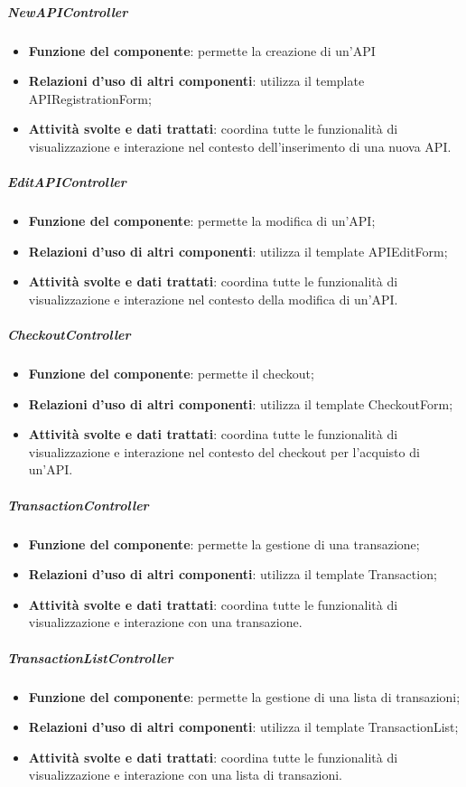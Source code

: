 \subparagraph{NewAPIController}
\begin{itemize}
	\item \textbf{Funzione del componente}: permette la creazione di un'API	
	\item \textbf{Relazioni d’uso di altri componenti}: utilizza il template APIRegistrationForm;
	\item \textbf{Attività svolte e dati trattati}: coordina tutte le funzionalità di visualizzazione e interazione nel contesto dell'inserimento di una nuova API.
\end{itemize}

\subparagraph{EditAPIController}
\begin{itemize}
	\item \textbf{Funzione del componente}: permette la modifica di un'API;
	\item \textbf{Relazioni d’uso di altri componenti}: utilizza il template APIEditForm;
	\item \textbf{Attività svolte e dati trattati}: coordina tutte le funzionalità di visualizzazione e interazione nel contesto della modifica di un'API.
\end{itemize}

\subparagraph{CheckoutController}
\begin{itemize}
	\item \textbf{Funzione del componente}: permette il checkout;
	\item \textbf{Relazioni d’uso di altri componenti}: utilizza il template CheckoutForm;
	\item \textbf{Attività svolte e dati trattati}: coordina tutte le funzionalità di visualizzazione e interazione nel contesto del checkout per l'acquisto di un'API.
\end{itemize}

\subparagraph{TransactionController}
\begin{itemize}
	\item \textbf{Funzione del componente}: permette la gestione di una transazione;
	\item \textbf{Relazioni d’uso di altri componenti}: utilizza il template Transaction;
	\item \textbf{Attività svolte e dati trattati}: coordina tutte le funzionalità di visualizzazione e interazione con una transazione.
\end{itemize}

\subparagraph{TransactionListController}
\begin{itemize}
	\item \textbf{Funzione del componente}: permette la gestione di una lista di transazioni;
	\item \textbf{Relazioni d’uso di altri componenti}: utilizza il template TransactionList;
	\item \textbf{Attività svolte e dati trattati}: coordina tutte le funzionalità di visualizzazione e interazione con una lista di transazioni.
\end{itemize}

